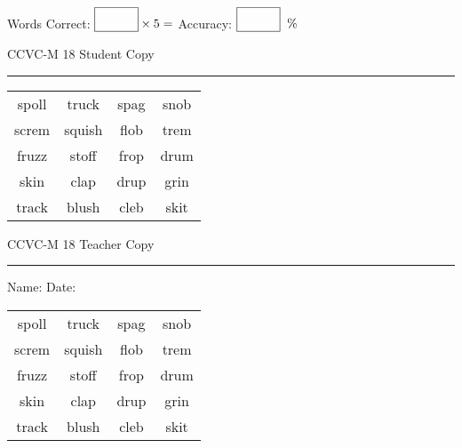 \documentclass{memoir}
\begin{document}
\small

Words Correct: $\fbox{\phantom{\huge 100}} \times 5 = $ Accuracy: $\fbox{\phantom{\huge 100}}\;\; \%$ 

\vfill

\newpage


\footnotesize \noindent
CCVC-M 18 \hfill Student Copy
\smallskip
\hrule

\Large

\setlength{\tabcolsep}{14pt}
\def\arraystretch{3}

{\selectfont


\begin{vplace}[0.5]
\begin{center}
\begin{tabular}{cccc}
spoll & truck & spag          & snob \\
screm & squish & flob             & trem \\
fruzz & stoff & frop & drum \\
skin & clap             & drup & grin     \\
track       & blush & cleb & skit \\
\end{tabular}
\end{center}
\end{vplace}

}

\newpage

\footnotesize \noindent
CCVC-M 18 \hfill Teacher Copy
\smallskip
\hrule

\small

\vfill

\noindent
Name: \underline{\hspace{1.75in}} \hfill Date: \underline{\hspace{1in}}

\Large

{\selectfont


\begin{vplace}[0.5]
\begin{center}
\begin{tabular}{cccc}
spoll & truck & spag          & snob \\
screm & squish & flob             & trem \\
fruzz & stoff & frop & drum \\
skin & clap             & drup & grin     \\
track       & blush & cleb & skit \\
\end{tabular}
\end{center}
\end{vplace}



}
\end{document}
